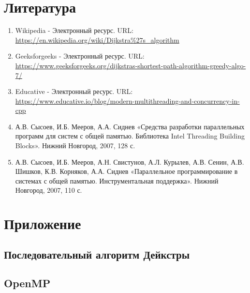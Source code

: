 \documentclass{report}
\begin{document}
\section*{Литература}
\begin{enumerate}
\item Wikipedia - Электронный ресурс. URL: \newline \url{https://en.wikipedia.org/wiki/Dijkstra%27s_algorithm}
\item Geeksforgeeks - Электронный ресурс. URL: \newline \url{https://www.geeksforgeeks.org/dijkstras-shortest-path-algorithm-greedy-algo-7/}
\item Educative - Электронный ресурс. URL: \newline \url{https://www.educative.io/blog/modern-multithreading-and-concurrency-in-cpp}
\item А.В. Сысоев, И.Б. Мееров, А.А. Сиднев «Средства разработки параллельных программ для систем с общей памятью. Библиотека Intel Threading Building Blocks». Нижний Новгород, 2007, 128 с. 
\item А.В. Сысоев, И.Б. Мееров, А.Н. Свистунов, А.Л. Курылев, А.В. Сенин, А.В. Шишков, К.В. Корняков, А.А. Сиднев «Параллельное программирование в системах с общей
памятью. Инструментальная поддержка». Нижний Новгород, 2007, 110 с. 
\end{enumerate}


\newpage

\section*{Приложение}
\subsection*{Последовательный алгоритм Дейкстры}




\subsection*{OpenMP}



\end{document}

